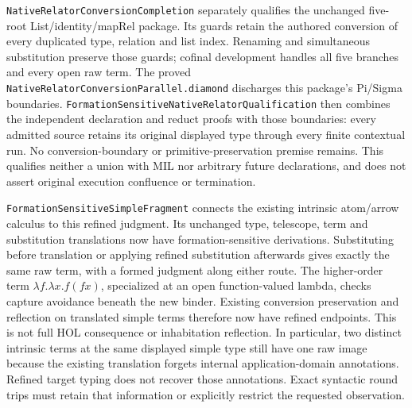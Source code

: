 \documentclass[11pt]{article}
\theoremstyle{definition}
\theoremstyle{remark}
\begin{document}
\nolinkurl{NativeRelatorConversionCompletion} separately qualifies the
unchanged five-root List/identity/mapRel package. Its guards retain the
authored conversion of every duplicated type, relation and list index.
Renaming and simultaneous substitution preserve those guards; cofinal
development handles all five branches and every open raw term. The proved
\nolinkurl{NativeRelatorConversionParallel.diamond} discharges this package's
Pi/Sigma boundaries. \nolinkurl{FormationSensitiveNativeRelatorQualification}
then combines the independent declaration and reduct proofs with those
boundaries: every admitted source retains its original displayed type through
every finite contextual run. No conversion-boundary or primitive-preservation
premise remains. This qualifies neither a union with MIL nor arbitrary future
declarations, and does not assert original execution confluence or termination.

\nolinkurl{FormationSensitiveSimpleFragment} connects the existing intrinsic
atom/arrow calculus to this refined judgment. Its unchanged type, telescope,
term and substitution translations now have formation-sensitive derivations.
Substituting before translation or applying refined substitution afterwards
gives exactly the same raw term, with a formed judgment along either route.
The higher-order term $\lambda f.\lambda x.f(fx)$, specialized at an open
function-valued lambda, checks capture avoidance beneath the new binder.
Existing conversion preservation and reflection on translated simple terms
therefore now have refined endpoints. This is not full HOL consequence or
inhabitation reflection. In particular, two distinct intrinsic terms at the
same displayed simple type still have one raw image because the existing
translation forgets internal application-domain annotations. Refined target
typing does not recover those annotations. Exact syntactic round trips must
retain that information or explicitly restrict the requested observation.
\end{document}
